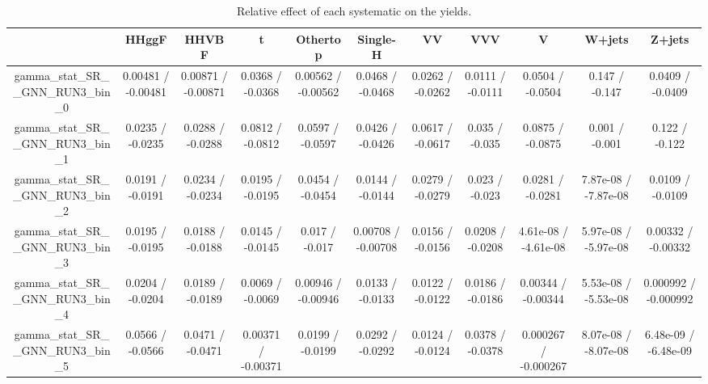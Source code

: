 \documentclass[10pt]{article}
\begin{document}
\begin{table}[htbp]
\begin{center}
\begin{tabular}{|c|c|c|c|c|c|c|c|c|c|c|}
\hline 
      & HHggF      & HHVBF      & t      & Othertop      & Single-H      & VV      & VVV      & V      & W+jets      & Z+jets \\ 
\hline 
  gamma_stat_SR__GNN_RUN3_bin_0 & 0.00481 / -0.00481 & 0.00871 / -0.00871 & 0.0368 / -0.0368 & 0.00562 / -0.00562 & 0.0468 / -0.0468 & 0.0262 / -0.0262 & 0.0111 / -0.0111 & 0.0504 / -0.0504 & 0.147 / -0.147 & 0.0409 / -0.0409 \\ 
  gamma_stat_SR__GNN_RUN3_bin_1 & 0.0235 / -0.0235 & 0.0288 / -0.0288 & 0.0812 / -0.0812 & 0.0597 / -0.0597 & 0.0426 / -0.0426 & 0.0617 / -0.0617 & 0.035 / -0.035 & 0.0875 / -0.0875 & 0.001 / -0.001 & 0.122 / -0.122 \\ 
  gamma_stat_SR__GNN_RUN3_bin_2 & 0.0191 / -0.0191 & 0.0234 / -0.0234 & 0.0195 / -0.0195 & 0.0454 / -0.0454 & 0.0144 / -0.0144 & 0.0279 / -0.0279 & 0.023 / -0.023 & 0.0281 / -0.0281 & 7.87e-08 / -7.87e-08 & 0.0109 / -0.0109 \\ 
  gamma_stat_SR__GNN_RUN3_bin_3 & 0.0195 / -0.0195 & 0.0188 / -0.0188 & 0.0145 / -0.0145 & 0.017 / -0.017 & 0.00708 / -0.00708 & 0.0156 / -0.0156 & 0.0208 / -0.0208 & 4.61e-08 / -4.61e-08 & 5.97e-08 / -5.97e-08 & 0.00332 / -0.00332 \\ 
  gamma_stat_SR__GNN_RUN3_bin_4 & 0.0204 / -0.0204 & 0.0189 / -0.0189 & 0.0069 / -0.0069 & 0.00946 / -0.00946 & 0.0133 / -0.0133 & 0.0122 / -0.0122 & 0.0186 / -0.0186 & 0.00344 / -0.00344 & 5.53e-08 / -5.53e-08 & 0.000992 / -0.000992 \\ 
  gamma_stat_SR__GNN_RUN3_bin_5 & 0.0566 / -0.0566 & 0.0471 / -0.0471 & 0.00371 / -0.00371 & 0.0199 / -0.0199 & 0.0292 / -0.0292 & 0.0124 / -0.0124 & 0.0378 / -0.0378 & 0.000267 / -0.000267 & 8.07e-08 / -8.07e-08 & 6.48e-09 / -6.48e-09 \\ 
\hline 
\end{tabular} 
\caption{Relative effect of each systematic on the yields.} 
\end{center} 
\end{table} 
\end{document}
